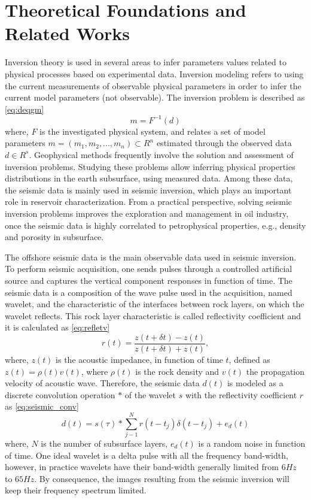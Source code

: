 \documentclass[conference]{IEEEtran}
\begin{document}
\section{Theoretical Foundations and Related Works}
Inversion theory is used in several areas to infer parameters values
related to physical processes based on experimental data.
Inversion modeling refers to using the current measurements of observable
physical parameters in order to infer the current model parameters (not observable).
The inversion problem is described as  \eqref{eq:deqgm}
\begin{equation}
\label{eq:deqgm}
m = F^{-1}(d)
\end{equation}
where, $F$ is the investigated physical system, and relates a set of model parameters
$m=(m_1, m_2,...,m_n)\subset R^n$ estimated through the observed data $d \in R^s$.
Geophysical methods frequently involve the solution and assessment of inversion problems.
Studying these problems allow inferring physical properties distributions in the earth subsurface, using measured
data. Among these data, the seismic data is mainly used in seismic inversion, which plays an important role in
reservoir characterization. From a practical perspective, solving seismic inversion problems improves
the exploration and management in oil industry, once the seismic data is highly correlated to petrophysical
properties, e.g., density and porosity in subsurface.

The offshore seismic data is the main observable data used in seismic inversion. To perform seismic acquisition,
one sends pulses through a controlled artificial source and captures
the vertical component responses in function of time. The seismic data is a composition of
the wave pulse used in the acquisition, named wavelet, and the characteristic of the interfaces between rock layers,
on which the wavelet reflects. This rock layer characteristic is called reflectivity coefficient and it is
calculated as \eqref{eq:refletv}
\begin{equation}
r(t) = \frac{z(t+\delta t)-z(t)}{z(t+\delta t)+z(t)},
\label{eq:refletv}
\end{equation}
where, $z(t)$ is the acoustic impedance, in function of time $t$, defined as 
$z(t)=\rho(t)v(t)$, where $\rho(t)$ is the rock density and $v(t)$ the propagation velocity
of acoustic wave.
Therefore, the seismic data  $d(t)$ is modeled as a discrete convolution operation $*$ of the wavelet $s$ with the
reflectivity coefficient $r$ as \eqref{eq:seismic_conv}
\begin{equation}
d(t) = s(\tau) * \sum_{j-1}^{N}{r(t- t_j) \delta(t - t_j) + e_d(t)}
\label{eq:seismic_conv}
\end{equation}
where, $N$ is the number of subsurface layers, $e_d(t)$ is a random noise in function of time.
One ideal wavelet is a delta pulse with all the frequency band-width, however, in practice
wavelets have their band-width generally limited from $6Hz$ to $65Hz$. By consequence,
the images resulting from the seismic inversion will keep their frequency spectrum limited.
\end{document}
